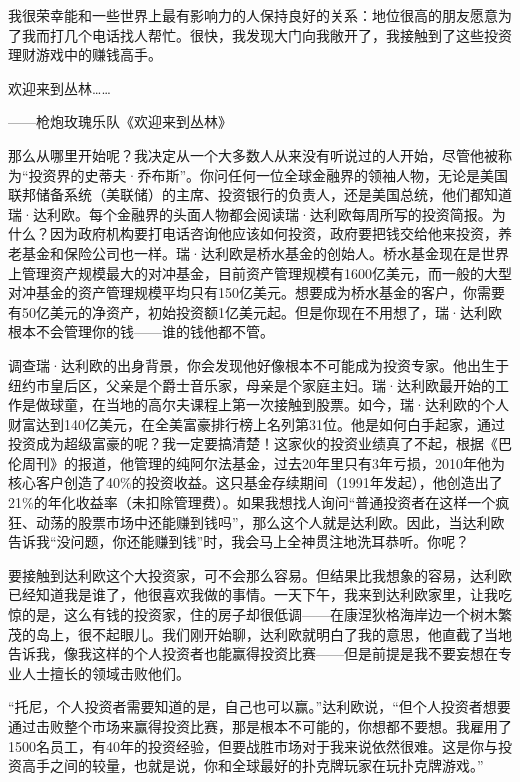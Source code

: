 我很荣幸能和一些世界上最有影响力的人保持良好的关系：地位很高的朋友愿意为了我而打几个电话找人帮忙。很快，我发现大门向我敞开了，我接触到了这些投资理财游戏中的赚钱高手。

\begin{BookQuote}
欢迎来到丛林……

\hfill ——枪炮玫瑰乐队《欢迎来到丛林》
\end{BookQuote}

那么从哪里开始呢？我决定从一个大多数人从来没有听说过的人开始，尽管他被称为“投资界的史蒂夫·乔布斯”。你问任何一位全球金融界的领袖人物，无论是美国联邦储备系统（美联储）的主席、投资银行的负责人，还是美国总统，他们都知道瑞·达利欧。每个金融界的头面人物都会阅读瑞·达利欧每周所写的投资简报。为什么？因为政府机构要打电话咨询他应该如何投资，政府要把钱交给他来投资，养老基金和保险公司也一样。瑞·达利欧是桥水基金的创始人。桥水基金现在是世界上管理资产规模最大的对冲基金，目前资产管理规模有1600亿美元，而一般的大型对冲基金的资产管理规模平均只有150亿美元。想要成为桥水基金的客户，你需要有50亿美元的净资产，初始投资额1亿美元起。但是你现在不用想了，瑞·达利欧根本不会管理你的钱——谁的钱他都不管。

调查瑞·达利欧的出身背景，你会发现他好像根本不可能成为投资专家。他出生于纽约市皇后区，父亲是个爵士音乐家，母亲是个家庭主妇。瑞·达利欧最开始的工作是做球童，在当地的高尔夫课程上第一次接触到股票。如今，瑞·达利欧的个人财富达到140亿美元，在全美富豪排行榜上名列第31位。他是如何白手起家，通过投资成为超级富豪的呢？我一定要搞清楚！这家伙的投资业绩真了不起，根据《巴伦周刊》的报道，他管理的纯阿尔法基金，过去20年里只有3年亏损，2010年他为核心客户创造了40\%的投资收益。这只基金存续期间（1991年发起），他创造出了21\%的年化收益率（未扣除管理费）。如果我想找人询问“普通投资者在这样一个疯狂、动荡的股票市场中还能赚到钱吗”，那么这个人就是达利欧。因此，当达利欧告诉我“没问题，你还能赚到钱”时，我会马上全神贯注地洗耳恭听。你呢？

要接触到达利欧这个大投资家，可不会那么容易。但结果比我想象的容易，达利欧已经知道我是谁了，他很喜欢我做的事情。一天下午，我来到达利欧家里，让我吃惊的是，这么有钱的投资家，住的房子却很低调——在康涅狄格海岸边一个树木繁茂的岛上，很不起眼儿。我们刚开始聊，达利欧就明白了我的意思，他直截了当地告诉我，像我这样的个人投资者也能赢得投资比赛——但是前提是我不要妄想在专业人士擅长的领域击败他们。

“托尼，个人投资者需要知道的是，自己也可以赢。”达利欧说，“但个人投资者想要通过击败整个市场来赢得投资比赛，那是根本不可能的，你想都不要想。我雇用了1500名员工，有40年的投资经验，但要战胜市场对于我来说依然很难。这是你与投资高手之间的较量，也就是说，你和全球最好的扑克牌玩家在玩扑克牌游戏。”

